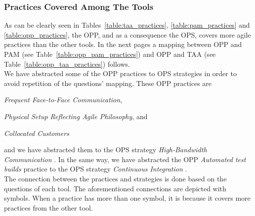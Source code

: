 \subsubsection[Tool Practices]{Practices Covered Among The Tools}

As can be clearly seen in Tables~\ref{table:taa_practices}, \ref{table:pam_practices} and \ref{table:opp_practices}, the \ac{OPP}, and as a consequence the \ac{OPS}, covers more agile practices than the other tools. In the next pages a mapping between \ac{OPP} and \ac{PAM} (see Table~\ref{table:opp_pam_practices}) and \ac{OPP} and \ac{TAA} (see Table~\ref{table:opp_taa_practices}) follows. \\

We have abstracted some of the \ac{OPP} practices to \ac{OPS} strategies in order to avoid repetition of the questions' mapping. These \ac{OPP} practices are 
\begin{inparaenum} [a\upshape)]
	\item \textit{Frequent Face-to-Face Communication},
	\item \textit{Physical Setup Reflecting Agile Philosophy}, and
	\item \textit{Collocated Customers}
\end{inparaenum} and we have abstracted them to the \ac{OPS} strategy \textit{High-Bandwidth Communication}  \cite[p. 57]{sventha_dissertation}. In the same way, we have abstracted the \ac{OPP} \textit{Automated test builds} practice to the \ac{OPS} strategy \textit{Continuous Integration} \cite[p. 57]{sventha_dissertation}. \\

The connection between the practices and strategies is done based on the questions of each tool. The aforementioned connections are depicted with symbols. When a practice has more than one symbol, it is because it covers more practices from the other tool. \\

